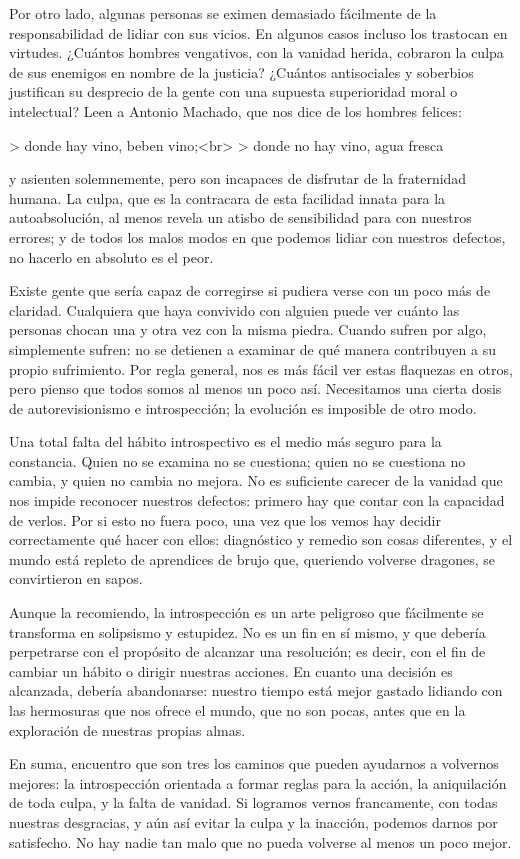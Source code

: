 \documentclass[a4paper, 12pt]{article}
\begin{document}
Por otro lado, algunas personas se eximen demasiado fácilmente de la
responsabilidad de lidiar con sus vicios. En algunos casos incluso los
trastocan en virtudes. ¿Cuántos hombres vengativos, con la vanidad herida,
cobraron la culpa de sus enemigos en nombre de la justicia? ¿Cuántos
antisociales y soberbios justifican su desprecio de la gente con una supuesta
superioridad moral o intelectual? Leen a Antonio Machado, que nos dice de los
hombres felices:

> donde hay vino, beben vino;<br>
> donde no hay vino, agua fresca

y asienten solemnemente, pero son incapaces de disfrutar de la fraternidad
humana. La culpa, que es la contracara de esta facilidad innata para la
autoabsolución, al menos revela un atisbo de sensibilidad para con nuestros
errores; y de todos los malos modos en que podemos lidiar con nuestros
defectos, no hacerlo en absoluto es el peor. 

Existe gente que sería capaz de corregirse si pudiera verse con un poco más de
claridad. Cualquiera que haya convivido con alguien puede ver cuánto las
personas chocan una y otra vez con la misma piedra. Cuando sufren por algo,
simplemente sufren: no se detienen a examinar de qué manera contribuyen a su
propio sufrimiento. Por regla general, nos es más fácil ver estas flaquezas en
otros, pero pienso que todos somos al menos un poco así. Necesitamos una cierta 
dosis de autorevisionismo e introspección; la evolución es imposible de otro modo.

Una total falta del hábito introspectivo es el medio más seguro para la
constancia. Quien no se examina no se cuestiona; quien no se cuestiona no
cambia, y quien no cambia no mejora. No es suficiente carecer de la vanidad que
nos impide reconocer nuestros defectos: primero hay que contar con la capacidad
de verlos. Por si esto no fuera poco, una vez que los vemos hay decidir
correctamente qué hacer con ellos: diagnóstico y remedio son cosas diferentes,
y el mundo está repleto de aprendices de brujo que, queriendo volverse
dragones, se convirtieron en sapos.

Aunque la recomiendo, la introspección es un arte peligroso que fácilmente se
transforma en solipsismo y estupidez. No es un fin en sí mismo, y que debería
perpetrarse con el propósito de alcanzar una resolución; es decir, con el fin
de cambiar un hábito o dirigir nuestras acciones. En cuanto una decisión es
alcanzada, debería abandonarse: nuestro tiempo está mejor gastado lidiando con
las hermosuras que nos ofrece el mundo, que no son pocas, antes que en la
exploración de nuestras propias almas.

En suma, encuentro que son tres los caminos que pueden ayudarnos a volvernos
mejores: la introspección orientada a formar reglas para la acción, la
aniquilación de toda culpa, y la falta de vanidad. Si logramos vernos
francamente, con todas nuestras desgracias, y aún así evitar la culpa y la
inacción, podemos darnos por satisfecho. No hay nadie tan malo que no pueda
volverse al menos un poco mejor.
\end{document}
